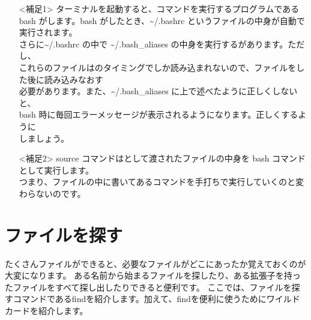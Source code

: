 \begin{itemize}
    \item[<補足1>] ターミナルを起動すると、コマンドを実行するプログラムである bash がします。bash がしたとき、\textasciitilde/.bashrc というファイルの中身が自動で実行されます。\\
    さらに\textasciitilde/.bashrc の中で \textasciitilde/.bash{\_}aliases の中身を実行するがあります。ただし、\\
    これらのファイルはのタイミングでしか読み込まれないので、ファイルをした後に読み込みなおす\\
    必要があります。また、\textasciitilde/.bash{\_}aliases に上で述べたように正しくしないと、\\
    bash 時に毎回エラーメッセージが表示されるようになります。正しくするように\\
    しましょう。
    \item[<補足2>] source コマンドはとして渡されたファイルの中身を bash コマンドとして実行します。\\
    つまり、ファイルの中に書いてあるコマンドを手打ちで実行していくのと変わらないのです。
\end{itemize}

\begin{tcolorbox}[title=\useOmetoi]
    \begin{enumerate}
    \end{enumerate}
\end{tcolorbox}


\section{ファイルを探す}
たくさんファイルができると、必要なファイルがどこにあったか覚えておくのが大変になります。
ある名前から始まるファイルを探したり、ある拡張子を持ったファイルをすべて探し出したりできると便利です。
ここでは、ファイルを探すコマンドであるfindを紹介します。加えて、findを便利に使うためにワイルドカードを紹介します。

